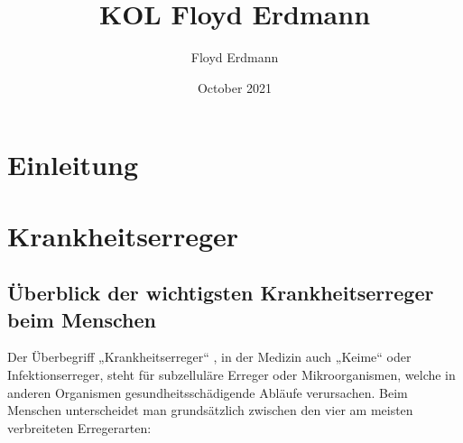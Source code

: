 \documentclass[12pt]{article}
\title{KOL Floyd Erdmann}
\author{Floyd Erdmann}
\date{October 2021}
\begin{document}
\setlength{\baselineskip}{5mm}
\maketitle
\onehalfspacing

\newpage

\tableofcontents

\newpage
\section{Einleitung}


\section{Krankheitserreger}
\subsection{Überblick der wichtigsten Krankheitserreger beim Menschen}
Der Überbegriff „Krankheitserreger“ \cite{DUMMY:1}, in der Medizin auch „Keime“ oder \glqq Infektionserreger\grqq, steht für subzelluläre Erreger oder Mikroorganismen, welche in anderen Organismen gesundheitsschädigende Abläufe verursachen. Beim Menschen unterscheidet man grundsätzlich zwischen den vier am meisten verbreiteten Erregerarten:
\end{document}
